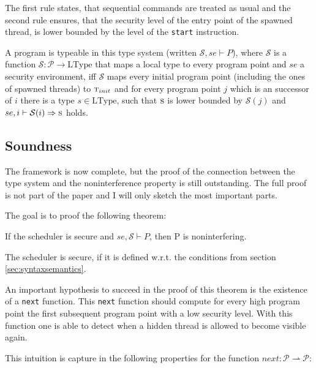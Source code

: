 \documentclass[a4paper,10pt]{llncs}
\begin{document}
The first rule states, that sequential commands are treated as usual
and the second rule ensures, that the security level of the entry point
of the spawned thread, is lower bounded by the level of the \texttt{start}
instruction.

A program is typeable in this type system (written $\mathcal{S}, se \vdash P$),
where $\mathcal{S}$ is a function $\mathcal{S}: \mathcal{P} \rightarrow \text{LType}$
that maps a local type to every program point
and $se$ a security environment, iff $\mathcal{S}$ maps every initial program point
(including the ones of spawned threads) to $\textsc{t}_{init}$ and for every program point $j$ which is an
successor of $i$ there is a type $s \in \text{LType}$, such that $\textsc{s}$ is lower bounded
by $\mathcal{S}(j)$ and $se, i \vdash \mathcal{S}(i) \Rightarrow \textsc{s}$ holds.


\subsection{Soundness}
\label{sec:soundness}
The framework is now complete, but the proof of the connection between the
type system and the noninterference property is still outstanding. The full
proof is not part of the paper and I will only sketch the most important
parts.

The goal is to proof the following theorem:

\begin{theorem}
If the scheduler is secure and $se, \mathcal{S} \vdash P$, then P is noninterfering.
\end{theorem}

The scheduler is secure, if it is defined w.r.t. the conditions from section \ref{sec:syntaxsemantics}.

An important hypothesis to succeed in the proof of this theorem is the existence
of a \texttt{next} function. This \texttt{next} function should compute for every
high program point the first subsequent program point with a low security level. With
this function one is able to detect when a hidden thread is allowed to become visible
again.

This intuition is capture in the following properties for the function $next: \mathcal{P}
\rightharpoonup \mathcal{P}$:
\end{document}
